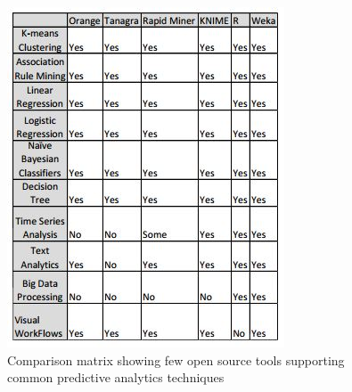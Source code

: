 \documentclass[runningheads]{llncs}
\begin{document}
 
\begin{figure}[htbp]
	\centering
	
	\vspace{-1.3em}
	\hspace*{-0.45cm}
	
	\includegraphics[scale=0.65]{Figure9.jpg}
	\caption{Comparison matrix showing few open source tools supporting common predictive analytics techniques}
	\label{fig:Figure8}
	
\end{figure} 
\end{document}
